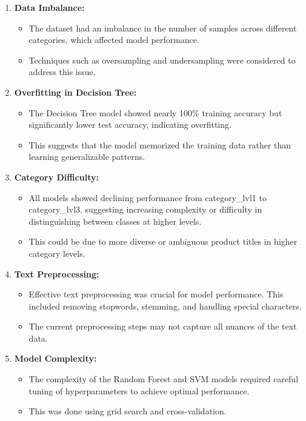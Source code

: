 \documentclass[10pt]{article}
\begin{document}
\begin{enumerate}
    \item \textbf{Data Imbalance:}
    \begin{itemize}
        \item The dataset had an imbalance in the number of samples across different categories, which affected model performance.
        \item Techniques such as oversampling and undersampling were considered to address this issue.
    \end{itemize}
    
    \item \textbf{Overfitting in Decision Tree:}
    \begin{itemize}
        \item The Decision Tree model showed nearly 100\% training accuracy but significantly lower test accuracy, indicating overfitting.
        \item This suggests that the model memorized the training data rather than learning generalizable patterns.
    \end{itemize}
    
    \item \textbf{Category Difficulty:}
    \begin{itemize}
        \item All models showed declining performance from category\_lvl1 to category\_lvl3, suggesting increasing complexity or difficulty in distinguishing between classes at higher levels.
        \item This could be due to more diverse or ambiguous product titles in higher category levels.
    \end{itemize}
    
    \item \textbf{Text Preprocessing:}
    \begin{itemize}
        \item Effective text preprocessing was crucial for model performance. This included removing stopwords, stemming, and handling special characters.
        \item The current preprocessing steps may not capture all nuances of the text data.
    \end{itemize}
    
    \item \textbf{Model Complexity:}
    \begin{itemize}
        \item The complexity of the Random Forest and SVM models required careful tuning of hyperparameters to achieve optimal performance.
        \item This was done using grid search and cross-validation.
    \end{itemize}
    

\end{enumerate}
\end{document}
